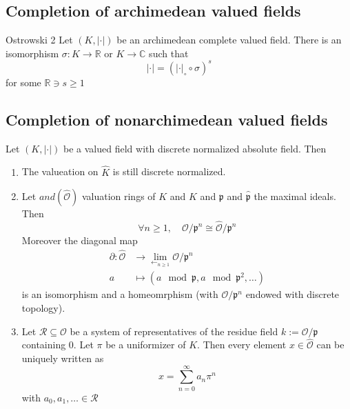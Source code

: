 \subsection{Completion of archimedean valued fields}

\begin{theorem}{Ostrowski 2}
    Let \({(K, |\cdot |)}\) be an archimedean complete valued field. There is an
    isomorphism \(\sigma : K \to \mathbb{R}\) or \(K \to \mathbb{C}\) such that 
    \[
      |\cdot | = {(|\cdot|_{\circ} \circ \sigma)}^{s}
    \]
    for some \(\mathbb{R} \ni s \ge 1\) 
\end{theorem}

\subsection{Completion of nonarchimedean valued fields}

\begin{proposition}{}
    Let \({(K, |\cdot|)}\) be a valued field with discrete normalized absolute
    field. Then

\begin{enumerate}[label = \arabic*.]
    \item The valueation on \(\widehat{K}\) is still discrete normalized.
    \item Let \(and {(\widehat{\mathcal{O}})}\) valuation rings of \(K\) and
        \(\widehat{K}\) and \(\mathfrak{p}\) and \(\widehat{\mathfrak{p}}\) the
        maximal ideals. Then
        \[
          \forall n \ge 1 ,\quad \mathcal{O}/\mathfrak{p}^{n} \cong
          \widehat{\mathcal{O}} / \mathfrak{p}^{n}
        \]
        Moreover the diagonal map
        \begin{align*}
            \partial: \widehat{\mathcal{O}} &\longrightarrow
            \lim_{\longleftarrow_{n \ge 1}}  \mathcal{O} / \mathfrak{p}^{n} \\
             a &\longmapsto {(a \mod \mathfrak{p}, a \mod \mathfrak{p}^2,
             \dots)}
        \end{align*}
        is an isomorphism and a homeomrphism (with \(\mathcal{O} /
        \mathfrak{p}^{n}\) endowed with discrete topology).
    \item Let \(\mathcal{R} \subseteq \mathcal{O} \) be a system of
        representatives of the residue field \(k := \mathcal{O} / \mathfrak{p}\)
        containing 0. Let \(\pi\) be a uniformizer of \(K\). Then every element
        \(x \in \widehat{\mathcal{O}}\) can be uniquely written as 
        \[
          x = \sum_{n=0}^{\infty} a_{n} \pi^{n} 
        \]
        with \(a_{0}, a_{1}, \dots \in \mathcal{R}\) 
\end{enumerate}
\end{proposition}


